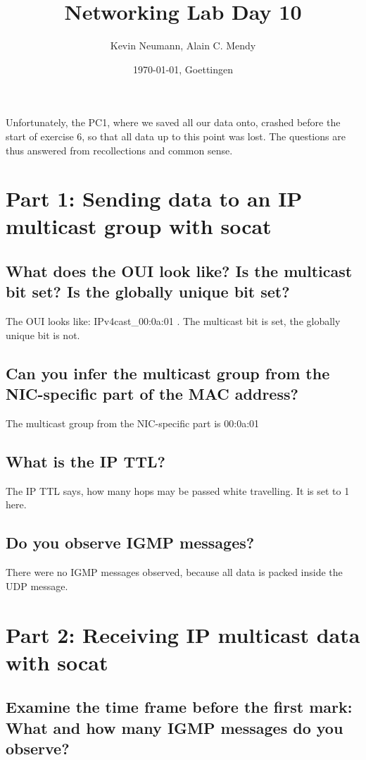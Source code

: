 \documentclass[a4paper, 11pt]{article}
\title{Networking Lab Day 10}
\author{Kevin Neumann, Alain C. Mendy}
\date{\today{}, Goettingen}
\begin{document}
\maketitle
\newpage

Unfortunately, the PC1, where we saved all our data onto, crashed before the start of exercise 6, so that all data up to this point was lost. The questions are thus answered from recollections and common sense.

\section{Part 1: Sending data to an IP multicast group with socat}

\subsection {What does the OUI look like? Is the multicast bit set? Is the globally unique bit set?}

The OUI looks like: IPv4cast_00:0a:01 . The multicast bit is set, the globally unique bit is not.

\subsection {Can you infer the multicast group from the NIC-specific part of the MAC address?}

The multicast group from the NIC-specific part is 00:0a:01

\subsection {What is the IP TTL?}

The IP TTL says, how many hops may be passed white travelling. It is set to 1 here.

\subsection {Do you observe IGMP messages?}

There were no IGMP messages observed, because all data is packed inside the UDP message.

\section{Part 2: Receiving IP multicast data with socat}

\subsection {Examine the time frame before the first mark: What and how many IGMP messages do you observe? }
\end{document}
